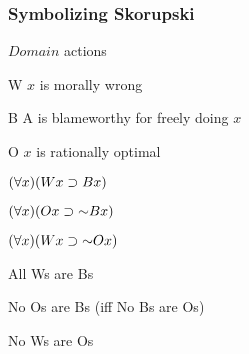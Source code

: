\begin{frame}
\frametitle{Symbolizing Skorupski}

\begin{ekey}
\item[$Domain$] actions
\item[W\qv{x}] $x$ is morally wrong
\item[B\qv{x}] A is blameworthy for freely doing $x$
\item[O\qv{x}] $x$ is rationally optimal
\end{ekey}
\begin{earg}
\item[] $(\forall x)(Wx \supset Bx)$
\item[] $\qt{\forall}{x}(O\qv{x} \to \lnot B\qv{x})$
\item[\therefore] $\qt{\forall}{x}(W\qv{x} \to \lnot O\qv{x})$
\end{earg}

\begin{earg}
\item[] All Ws are Bs
\item[] No Os are Bs (iff No Bs are Os)
\item[\therefore] No Ws are Os
\end{earg}

\end{frame}

